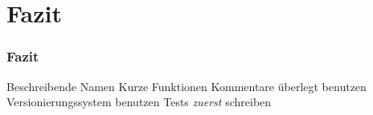 \documentclass{beamer}
\begin{document}
\section{Fazit}
\begin{frame}
    \frametitle{Fazit}
    \begin{outline}
        \1 Beschreibende Namen
        \1 Kurze Funktionen
        \1 Kommentare überlegt benutzen
        \1 Versionierungssystem benutzen
        \1 Tests \emph{zuerst} schreiben
    \end{outline}
\end{frame}
\end{document}
